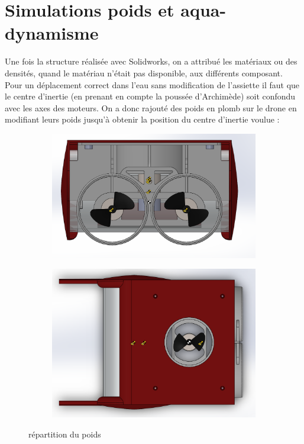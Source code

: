 \documentclass[a4paper,11pt]{report}
\begin{document}
			\section{Simulations poids et aqua-dynamisme}
					Une fois la structure réalisée avec Solidworks, on a attribué les matériaux ou des densités, quand le matériau n'était pas disponible, aux différents composant.\newline
				Pour un déplacement correct dans l'eau sans modification de l'assiette il faut que le centre d'inertie (en prenant en compte la poussée d’Archimède) soit confondu avec les axes des moteurs. On a donc rajouté des poids en plomb sur le drone en modifiant leurs poids jusqu'à obtenir la position du centre d'inertie voulue : 
					\begin{figure}[!h]
						\centering
							\begin{subfigure}[b]{0.3\textwidth}
								\includegraphics[width=\textwidth]{Photos/Capture20.png}
							\end{subfigure}
							\begin{subfigure}[b]{0.3\textwidth}
								\includegraphics[width=\textwidth]{Photos/Capture21.png}
							\end{subfigure}
							\caption{répartition du poids}
					\end{figure}\newline
					
\end{document}
